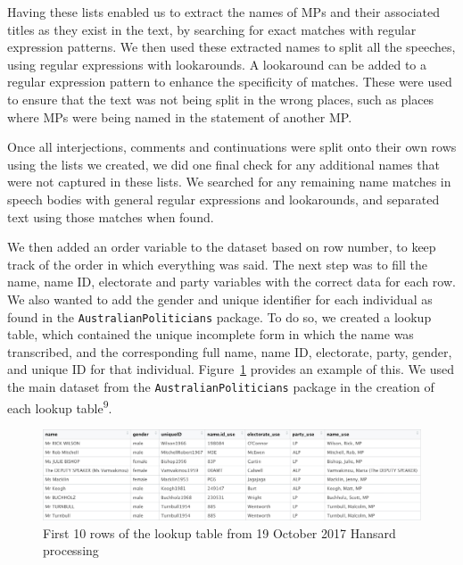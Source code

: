 \documentclass[
  letterpaper,
  DIV=11,
  numbers=noendperiod]{scrartcl}
\begin{document}
Having these lists enabled us to extract the names of MPs and their
associated titles as they exist in the text, by searching for exact
matches with regular expression patterns. We then used these extracted
names to split all the speeches, using regular expressions with
lookarounds. A lookaround can be added to a regular expression pattern
to enhance the specificity of matches. These were used to ensure that
the text was not being split in the wrong places, such as places where
MPs were being named in the statement of another MP.

Once all interjections, comments and continuations were split onto their
own rows using the lists we created, we did one final check for any
additional names that were not captured in these lists. We searched for
any remaining name matches in speech bodies with general regular
expressions and lookarounds, and separated text using those matches when
found.

We then added an order variable to the dataset based on row number, to
keep track of the order in which everything was said. The next step was
to fill the name, name ID, electorate and party variables with the
correct data for each row. We also wanted to add the gender and unique
identifier for each individual as found in the
\texttt{AustralianPoliticians} package. To do so, we created a lookup
table, which contained the unique incomplete form in which the name was
transcribed, and the corresponding full name, name ID, electorate,
party, gender, and unique ID for that individual.
Figure~\ref{fig-lookup} provides an example of this. We used the main
dataset from the \texttt{AustralianPoliticians} package in the creation
of each lookup table\textsuperscript{9}.

\begin{figure}

{\centering \includegraphics[width=4.66667in,height=\textheight]{lookup_ex.jpg}

}

\caption{\label{fig-lookup}First 10 rows of the lookup table from 19
October 2017 Hansard processing}

\end{figure}
\end{document}
